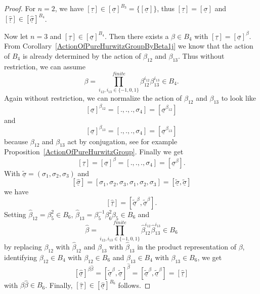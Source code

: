 \documentclass[12pt,a4paper]{article}
\numberwithin{equation}{section}
\numberwithin{table}{section}
\begin{document}
\begin{proof}
For $n=2$, we have $[\underline{\tau}] \in [\underline{\sigma}]^{B_3} = \{[\underline{\sigma}]\}$, thus
$[\underline{\tau}] = [\underline{\sigma}]$ and $[\widehat{\underline{\tau}}] \in [\widehat{\underline{\sigma}}]^{B_4}$.
\par
\noindent
Now let $n=3$ and $[\underline{\tau}] \in [\underline{\sigma}]^{B_4}$. Then there exists a $\beta \in B_4$
with $[\underline{\tau}] = [\underline{\sigma}]^{\beta}$.
From Corollary~\ref{ActionOfPureHurwitzGroupByBeta1j} we know that the action of $B_4$ is already determined by
the action of $\beta_{12}$ and $\beta_{13}$. Thus without restriction, we can assume
$$\beta = \prod\limits_{i_{12}, i_{13} \in \{-1,0,1\} }^{finite} \beta_{12}^{i_{12}} \beta_{13}^{i_{13}} \in B_4.$$
Again without restriction, we can normalize the action of $\beta_{12}$ and $\beta_{13}$ to look like
$$[\underline{\sigma}]^{\beta_{12}} = [., ., ., \sigma_4] = [\underline{\sigma}^{\beta_{12}}]$$ and
$$[\underline{\sigma}]^{\beta_{13}} = [., ., ., \sigma_4] = [\underline{\sigma}^{\beta_{13}}] $$
because $\beta_{12}$ and $\beta_{13}$ act by conjugation, see for example Proposition~\ref{ActionOfPureHurwitzGroup}.
Finally we get
$$[\underline{\tau}] = [\underline{\sigma}]^{\beta} = [., ., ., \sigma_4] = [\underline{\sigma}^{\beta}].$$
With $\tilde{\underline{\sigma}} = (\sigma_1, \sigma_2, \sigma_3)$ and
$$[\widehat{\underline{\sigma}}] = [\sigma_1, \sigma_2, \sigma_3, \sigma_1, \sigma_2, \sigma_3] =
[\tilde{\underline{\sigma}}, \tilde{\underline{\sigma}}]$$
we have
$$[\widehat{\underline{\tau}}] = [\tilde{\underline{\sigma}}^{\beta}, \tilde{\underline{\sigma}}^{\beta}].$$
Setting $\widehat{\beta}_{12} = \beta_5^2 \in B_6$, $\widehat{\beta}_{13} = \beta_5^{-1} \beta_6^2 \beta_5 \in B_6$ and 
$$\widehat{\beta} = \prod\limits_{i_{12}, i_{13} \in \{-1,0,1\} }^{finite} \widehat{\beta}_{12}^{i_{12}} \widehat{\beta}_{13}^{i_{13}} \in B_6$$
by replacing $\beta_{12}$ with $\widehat{\beta}_{12}$ and $\beta_{13}$ with $\widehat{\beta}_{13}$ in the product
representation of $\beta$, identifying $\beta_{12} \in B_4$ with $\beta_{12} \in B_6$ and
$\beta_{13} \in B_4$ with $\beta_{13} \in B_6$, we get
$$[\widehat{\underline{\sigma}}]^{\beta \widehat{\beta}} = [\tilde{\underline{\sigma}}^{\beta}, \tilde{\underline{\sigma}}]^{\widehat{\beta}} =
[\tilde{\underline{\sigma}}^{\beta}, \tilde{\underline{\sigma}}^{\beta}] = [\widehat{\underline{\tau}}]$$
with $\beta \widehat{\beta} \in B_6$.
Finally, $[\widehat{\underline{\tau}}] \in [\widehat{\underline{\sigma}}]^{B_6}$ follows.
\end{proof}
\end{document}
